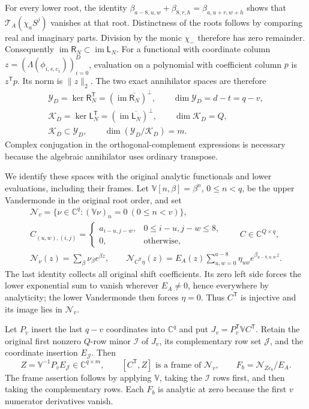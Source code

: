 For every lower root, the identity
$\beta_{a-8,u,w}+\beta_{8,r,h}=\beta_{a,u+r,w+h}$ shows that
$\mathcal T_A(\chi_aS^j)$ vanishes at that root. Distinctness of
the roots follows by comparing real and imaginary parts. Division
by the monic $\chi_-$ therefore has zero remainder. Consequently
$\operatorname{im}\mathsf R_N\subset\operatorname{im}\mathsf L_N$.
For a functional with coordinate column
$z=(\Lambda(\phi_{i,s,c_1}))_{i=0}^D$, evaluation on a polynomial
with coefficient column $p$ is $z^{\mathsf T}p$. Its norm is
$\|z\|_2$. The two exact annihilator spaces are therefore
\[
\begin{gathered}
 \mathscr Y_D=\ker\mathsf R_N^{\mathsf T}
    =(\operatorname{im}\overline{\mathsf R_N})^\perp,
       \qquad \dim\mathscr Y_D=d-t=q-v,\\
 \mathscr K_D=\ker\mathsf L_N^{\mathsf T}
    =(\operatorname{im}\overline{\mathsf L_N})^\perp,
       \qquad \dim\mathscr K_D=Q,\\
 \mathscr K_D\subset\mathscr Y_D,\qquad
 \dim(\mathscr Y_D/\mathscr K_D)=m.
\end{gathered}\tag{XIM6}
\]
Complex conjugation in the orthogonal-complement expressions is
necessary because the algebraic annihilator uses ordinary transpose.

We identify these spaces with the original analytic functionals and
lower evaluations, including their frames. Let
$\mathbb V[n,\beta]=\beta^n$, $0\le n<q$, be the upper
Vandermonde in the original root order, and set
\[
\begin{gathered}
 \mathscr N_v=\{\nu\in\mathbb C^q:(\mathbb V\nu)_n=0
                                     \ (0\le n<v)\},\\
 C_{(u,w),(i,j)}=
 \begin{cases}a_{i-u,j-w},&0\le i-u,j-w\le8,\\0,&\text{otherwise},\end{cases}
       \qquad C\in\mathbb C^{Q\times q},\\
 \mathcal N_\nu(z)=\sum_\beta\nu_\beta e^{\beta z},\qquad
 \mathcal N_{C^{\mathsf T}\eta}(z)
   =E_A(z)\sum_{u,w=0}^{a-8}\eta_{uw}e^{\beta_{a-8,u,w}z}.
\end{gathered}\tag{XIM7}
\]
The last identity collects all original shift coefficients. Its zero
left side forces the lower exponential sum to vanish wherever
$E_A\ne0$, hence everywhere by analyticity; the lower Vandermonde
then forces $\eta=0$. Thus $C^{\mathsf T}$ is injective and its
image lies in $\mathscr N_v$.

Let $P_v$ insert the last $q-v$ coordinates into $\mathbb C^q$ and
put $J_v=P_v^{\mathsf T}\mathbb VC^{\mathsf T}$. Retain the original
first nonzero $Q$-row minor $\mathcal I$ of $J_v$, its complementary
row set $\mathcal J$, and the coordinate insertion $E_{\mathcal J}$.
Then
\[
 Z=\mathbb V^{-1}P_vE_{\mathcal J}\in\mathbb C^{q\times m},
 \qquad [C^{\mathsf T},Z]\text{ is a frame of }\mathscr N_v,
 \qquad F_b=\mathcal N_{Ze_b}/E_A.
 \tag{XIM8}
\]
The frame assertion follows by applying $\mathbb V$, taking the
$\mathcal I$ rows first, and then taking the complementary rows.
Each $F_b$ is analytic at zero because the first $v$ numerator
derivatives vanish.

